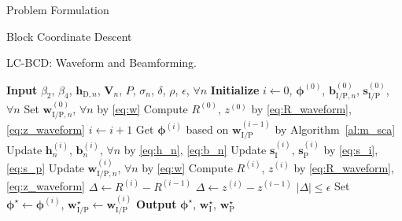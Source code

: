 \documentclass[journal]{IEEEtran}
\begin{document}
\begin{section}{Problem Formulation}
\begin{subsection}{Block Coordinate Descent}
			\begin{algorithm}[!t]
				\caption{LC-BCD: Waveform and Beamforming.}
				\label{al:lc_bcd}
				\begin{algorithmic}[1]
					\State \textbf{Input} $\beta_2$, $\beta_4$, $\boldsymbol{h}_{\mathrm{D},n}$, $\boldsymbol{V}_{n}$, $P$, $\sigma_n$, $\delta$, $\rho$, $\epsilon$, $\forall n$
					\State \textbf{Initialize} $i \gets 0$, $\boldsymbol{\phi}^{(0)}$, $\boldsymbol{b}_{\mathrm{I/P},n}^{(0)}$, $\boldsymbol{s}_{\mathrm{I/P}}^{(0)}$, $\forall n$
					\State Set $\boldsymbol{w}_{\mathrm{I/P},n}^{(0)}$, $\forall n$ by \eqref{eq:w}
					\State Compute $R^{(0)}$, $z^{(0)}$ by \eqref{eq:R_waveform}, \eqref{eq:z_waveform}
					\Repeat
						\State $i \gets i + 1$
						\State Get $\boldsymbol{\phi}^{(i)}$ based on $\boldsymbol{w}_{\mathrm{I/P}}^{(i-1)}$ by Algorithm~\ref{al:m_sca}
						\State Update $\boldsymbol{h}_n^{(i)}$, $\boldsymbol{b}_n^{(i)}$, $\forall n$ by \eqref{eq:h_n}, \eqref{eq:b_n}
						\State Update $\boldsymbol{s}_{\mathrm{I}}^{(i)}$, $\boldsymbol{s}_{\mathrm{P}}^{(i)}$ by \eqref{eq:s_i}, \eqref{eq:s_p}
						\State Update $\boldsymbol{w}_{\mathrm{I/P},n}^{(i)}$, $\forall n$ by \eqref{eq:w}
						\State Compute $R^{(i)}$, $z^{(i)}$ by \eqref{eq:R_waveform}, \eqref{eq:z_waveform}
							\State $\Delta \gets R^{(i)} - R^{(i-1)}$
						\Else
							\State $\Delta \gets z^{(i)} - z^{(i-1)}$
						\EndIf
					\Until $\lvert \Delta \rvert \le \epsilon$
					\State Set $\boldsymbol{\phi}^{\star} \gets \boldsymbol{\phi}^{(i)}$, $\boldsymbol{w}_{\mathrm{I/P}}^{\star} \gets \boldsymbol{w}_{\mathrm{I/P}}^{(i)}$
					\State \textbf{Output} $\boldsymbol{\phi}^{\star}$, $\boldsymbol{w}_{\mathrm{I}}^{\star}$, $\boldsymbol{w}_{\mathrm{P}}^{\star}$
				\end{algorithmic}
			\end{algorithm}
		\end{subsection}
	\end{section}
\end{document}
